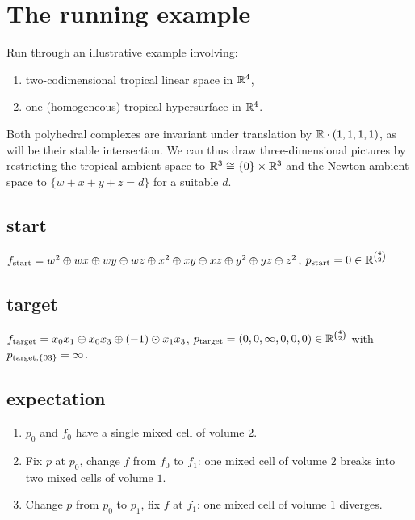 \section{The running example}
Run through an illustrative example involving:
\begin{enumerate}
\item two-codimensional tropical linear space in $\mathbb{R}^4$,
\item one (homogeneous) tropical hypersurface in $\mathbb{R}^4$.
\end{enumerate}

Both polyhedral complexes are invariant under translation by $\mathbb{R}\cdot(1,1,1,1)$, as will be their stable intersection.  We can thus draw three-dimensional pictures by restricting the tropical ambient space to $\mathbb{R}^3\cong \{0\}\times\mathbb{R}^3$ and the Newton ambient space to $\{w+x+y+z=d\}$ for a suitable $d$.

\subsection*{start}
$f_{{\mathrm{start}}} = w^2\oplus wx\oplus wy\oplus wz\oplus x^2\oplus xy\oplus xz\oplus y^2\oplus yz\oplus z^2$,
$p_{{\mathrm{start}}} = 0\in\mathbb{R}^{\binom{4}{2}}$

\subsection*{target}
$f_{{\mathrm{target}}} = x_0x_1\oplus x_0x_3\oplus (-1)\odot x_1x_3$,
$p_{{\mathrm{target}}} = (0,0,\infty,0,0,0)\in\mathbb{R}^{\binom{4}{2}}$ with $p_{{\mathrm{target}},\{03\}}=\infty$.

\subsection*{expectation}
\begin{enumerate}
\item $p_0$ and $f_0$ have a single mixed cell of volume $2$.
\item Fix $p$ at $p_0$, change $f$ from $f_0$ to $f_1$: one mixed cell of volume $2$ breaks into two mixed cells of volume $1$.
\item Change $p$ from $p_0$ to $p_1$, fix $f$ at $f_1$: one mixed cell of volume $1$ diverges.
\end{enumerate}

